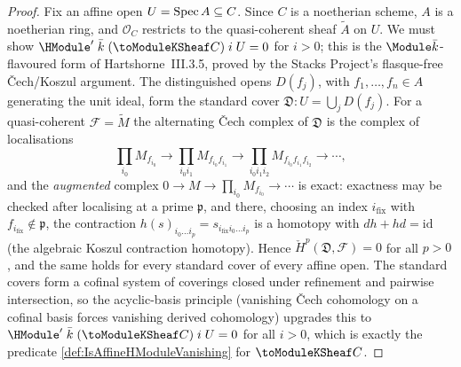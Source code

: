 \begin{proof}
  Fix an affine open \(U = \operatorname{Spec} A \subseteq C\). Since \(C\) is a
  noetherian scheme, \(A\) is a noetherian ring, and \(\mathcal O_C\)
  restricts to the quasi-coherent sheaf \(\widetilde A\) on \(U\). We
  must show \(\HModule'\;\bar k\;(\toModuleKSheaf C)\;i\;U = 0\) for
  \(i > 0\); this is the \(\Module \bar k\)-flavoured form of
  Hartshorne~III.3.5, proved by the Stacks Project's flasque-free
  Čech/Koszul argument. The distinguished opens \(D(f_j)\), with
  \(f_1, \dots, f_n \in A\) generating the unit ideal, form the standard
  cover \(\mathfrak D : U = \bigcup_j D(f_j)\). For a quasi-coherent
  \(\mathcal F = \widetilde M\) the alternating Čech complex of
  \(\mathfrak D\) is the complex of localisations
  \[
    \prod_{i_0} M_{f_{i_0}} \to
    \prod_{i_0 i_1} M_{f_{i_0} f_{i_1}} \to
    \prod_{i_0 i_1 i_2} M_{f_{i_0} f_{i_1} f_{i_2}} \to \cdots,
  \]
  and the \emph{augmented} complex \(0 \to M \to \prod_{i_0} M_{f_{i_0}}
  \to \cdots\) is exact: exactness may be checked after localising at a
  prime \(\mathfrak p\), and there, choosing an index \(i_{\mathrm{fix}}\)
  with \(f_{i_{\mathrm{fix}}} \notin \mathfrak p\), the contraction
  \(h(s)_{i_0 \dots i_p} = s_{i_{\mathrm{fix}} i_0 \dots i_p}\) is a
  homotopy with \(dh + hd = \mathrm{id}\) (the algebraic Koszul
  contraction homotopy). Hence \(\check H^p(\mathfrak D, \mathcal F) = 0\)
  for all \(p > 0\), and the same holds for every standard cover of
  every affine open. The standard covers form a cofinal system of
  coverings closed under refinement and pairwise intersection, so the
  acyclic-basis principle (vanishing Čech cohomology on a cofinal basis
  forces vanishing derived cohomology) upgrades this to
  \(\HModule'\;\bar k\;(\toModuleKSheaf C)\;i\;U = 0\) for all \(i > 0\),
  which is exactly the predicate \cref{def:IsAffineHModuleVanishing} for
  \(\toModuleKSheaf C\).

\end{proof}

